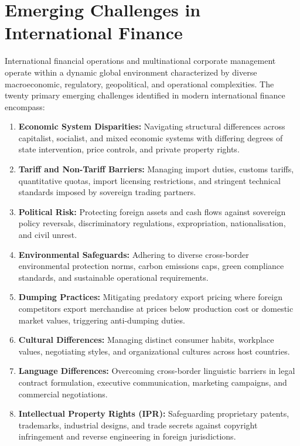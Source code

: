 \section{Emerging Challenges in International Finance}

International financial operations and multinational corporate management operate within a dynamic global environment characterized by diverse macroeconomic, regulatory, geopolitical, and operational complexities. The twenty primary emerging challenges identified in modern international finance encompass:

\begin{enumerate}[leftmargin=*]
    \item \textbf{Economic System Disparities:} Navigating structural differences across capitalist, socialist, and mixed economic systems with differing degrees of state intervention, price controls, and private property rights.
    \item \textbf{Tariff and Non-Tariff Barriers:} Managing import duties, customs tariffs, quantitative quotas, import licensing restrictions, and stringent technical standards imposed by sovereign trading partners.
    \item \textbf{Political Risk:} Protecting foreign assets and cash flows against sovereign policy reversals, discriminatory regulations, expropriation, nationalisation, and civil unrest.
    \item \textbf{Environmental Safeguards:} Adhering to diverse cross-border environmental protection norms, carbon emissions caps, green compliance standards, and sustainable operational requirements.
    \item \textbf{Dumping Practices:} Mitigating predatory export pricing where foreign competitors export merchandise at prices below production cost or domestic market values, triggering anti-dumping duties.
    \item \textbf{Cultural Differences:} Managing distinct consumer habits, workplace values, negotiating styles, and organizational cultures across host countries.
    \item \textbf{Language Differences:} Overcoming cross-border linguistic barriers in legal contract formulation, executive communication, marketing campaigns, and commercial negotiations.
    \item \textbf{Intellectual Property Rights (IPR):} Safeguarding proprietary patents, trademarks, industrial designs, and trade secrets against copyright infringement and reverse engineering in foreign jurisdictions.

\end{enumerate}

